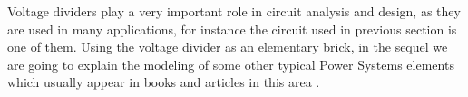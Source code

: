 \documentclass[11pt, a4paper]{article}
\theoremstyle{definition}
\theoremstyle{plain}
\theoremstyle{plain}
\theoremstyle{remark}
\theoremstyle{remark}
\theoremstyle{remark}
\begin{document}
{	Voltage dividers play a very important role in circuit analysis and design, as they are used in many applications, for instance the circuit used in previous section is one of them. Using the voltage divider as an elementary brick, in the sequel we are going to explain the modeling of some other typical Power Systems elements which usually appear in books and articles in this area \cite{Weedy2012}.
	
	
	
	
	
	
	
}
\end{document}

